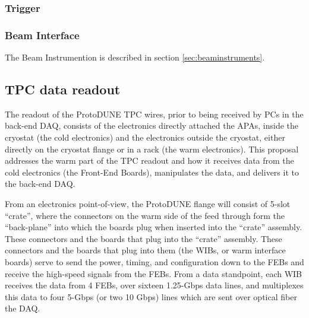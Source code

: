\subsubsection{Trigger}


\subsubsection{Beam Interface}

The Beam Instrumention is described in section \ref{sec:beaminstruments}.

\subsection{TPC data readout}


The readout of the ProtoDUNE TPC wires, prior to being received by PCs in
the back-end DAQ, consists of the electronics directly attached the APAs,
inside the cryostat (the cold electronics) and the electronics outside
the cryostat, either directly on the cryostat flange or in a rack (the
warm electronics).  This proposal addresses the warm part of the TPC
readout and how it receives data from the cold electronics (the Front-End
Boards), manipulates the data, and delivers it to the back-end DAQ.

From an electronics point-of-view, the ProtoDUNE flange will consist of
5-slot ``crate'', where the connectors on the warm side of the feed
through form the ``back-plane'' into which the boards plug when inserted
into the ``crate'' assembly.  These connectors and the boards that plug
into the ``crate'' assembly.  These connectors and the boards that plug
into them (the WIBs, or warm interface boards) serve to send the power,
timing, and configuration down to the FEBs and receive the high-speed
signals from the FEBs. From a data standpoint, each WIB receives the
data from 4 FEBs, over sixteen 1.25-Gbps data lines, and multiplexes
this data to four 5-Gbps (or two 10 Gbps) lines which are sent over
optical fiber the DAQ.

